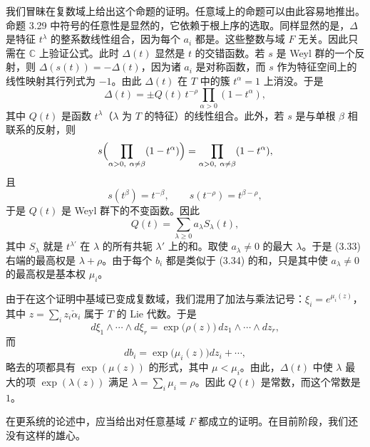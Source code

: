 我们冒昧在复数域上给出这个命题的证明。任意域上的命题可以由此容易地推出。命题 3.29 中符号的任意性是显然的，它依赖于根上序的选取。同样显然的是，$\Delta$ 是特征 $t^\lambda$ 的整系数线性组合，因为每个 $a_i$ 都是。这些整数与域 $F$ 无关。因此只需在 $\mathbb C$ 上验证公式。此时 $\Delta(t)$ 显然是 $t$ 的交错函数。若 $s$ 是 Weyl 群的一个反射，则 $\Delta(s(t))=-\Delta(t)$，因为诸 $a_i$ 是对称函数，而 $s$ 作为特征空间上的线性映射其行列式为 $-1$。由此 $\Delta(t)$ 在 $T$ 中的簇 $t^\alpha=1$ 上消没。于是
\begin{equation}\tag{3.33}
\Delta(t)=\pm Q(t)\,t^{-\rho}\prod_{\alpha>0}(1-t^\alpha),
\end{equation}
其中 $Q(t)$ 是函数 $t^\lambda$（$\lambda$ 为 $T$ 的特征）的线性组合。此外，若 $s$ 是与单根 $\beta$ 相联系的反射，则
\[
s\Bigl(\prod_{\alpha>0,\ \alpha\ne\beta}(1-t^\alpha)\Bigr)
=\prod_{\alpha>0,\ \alpha\ne\beta}(1-t^\alpha),
\]
且
\[
s(t^\beta)=t^{-\beta},\qquad s(t^{-\rho})=t^{\beta-\rho},
\]
于是 $Q(t)$ 是 Weyl 群下的不变函数。因此
\begin{equation}\tag{3.34}
Q(t)=\sum_{\lambda\ge0}a_\lambda S_\lambda(t),
\end{equation}
其中 $S_\lambda$ 就是 $t^{\lambda'}$ 在 $\lambda$ 的所有共轭 $\lambda'$ 上的和。取使 $a_\lambda\ne0$ 的最大 $\lambda$。于是 (3.33) 右端的最高权是 $\lambda+\rho$。由于每个 $b_i$ 都是类似于 (3.34) 的和，只是其中使 $a_\lambda\ne0$ 的最高权是基本权 $\mu_i$。

由于在这个证明中基域已变成复数域，我们混用了加法与乘法记号：$\xi_i=e^{\mu_i(z)}$，其中 $z=\sum_iz_i\check\alpha_i$ 属于 $T$ 的 Lie 代数。于是
\[
d\xi_1\wedge\cdots\wedge d\xi_r=\exp\bigl(\rho(z)\bigr)\,dz_1\wedge\cdots\wedge dz_r,
\]
而
\[
db_i=\exp\bigl(\mu_i(z)\bigr)dz_i+\cdots,
\]
略去的项都具有 $\exp(\mu(z))$ 的形式，其中 $\mu<\mu_i$。由此，$\Delta(t)$ 中使 $\lambda$ 最大的项 $\exp(\lambda(z))$ 满足 $\lambda=\sum_i\mu_i=\rho$。因此 $Q(t)$ 是常数，而这个常数是 $1$。

在更系统的论述中，应当给出对任意基域 $F$ 都成立的证明。在目前阶段，我们还没有这样的雄心。
